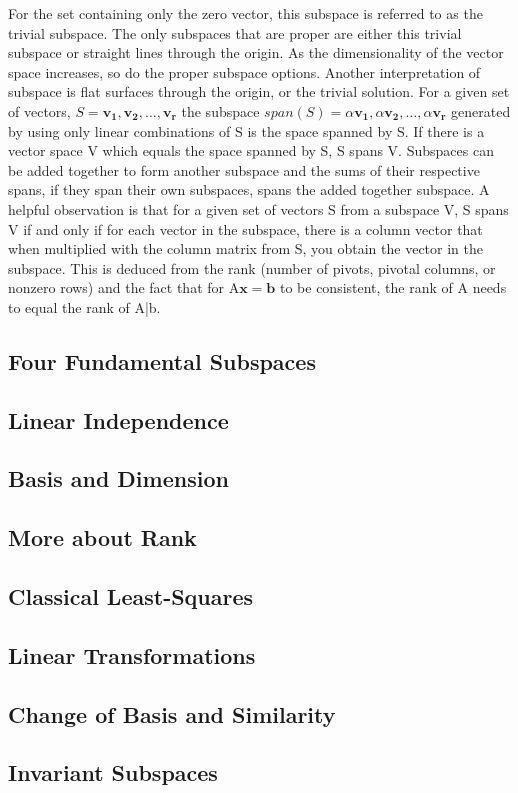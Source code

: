 \documentclass[12pt]{article}
\begin{document}
For the set containing only the zero vector, this subspace is referred to as the trivial subspace. The only subspaces that are proper are either this trivial subspace or 
straight lines through the origin. As the dimensionality of the vector space increases, so do the proper subspace options. Another interpretation of subspace is flat surfaces 
through the origin, or the trivial solution. 
\newline
\newline
For a given set of vectors, $S={\mathbf{v_1, v_2, \dotsc, v_r}}$ the subspace $span(S)={\alpha\mathbf{v_1}, \alpha\mathbf{v_2}, \dotsc, \alpha\mathbf{v_r}}$ generated by 
using only linear combinations of S is the space spanned by S. If there is a vector space V which equals the space spanned by S, S spans V. Subspaces can be added together 
to form another subspace and the sums of their respective spans, if they span their own subspaces, spans the added together subspace. 
\newline
\newline
A helpful observation is that for a given set of vectors S from a subspace V, S spans V if and only if for each vector in the subspace, there is a column vector that when 
multiplied with the column matrix from S, you obtain the vector in the subspace. This is deduced from the rank (number of pivots, pivotal columns, or nonzero rows) and 
the fact that for A$\mathbf{x=b}$ to be consistent, the rank of A needs to equal the rank of A|b. 
\subsection{Four Fundamental Subspaces}
\subsection{Linear Independence}
\subsection{Basis and Dimension}
\subsection{More about Rank}
\subsection{Classical Least-Squares}
\subsection{Linear Transformations}
\subsection{Change of Basis and Similarity}
\subsection{Invariant Subspaces}
\end{document}
